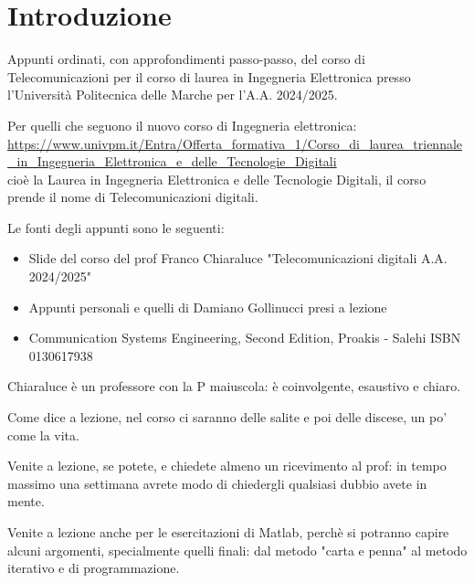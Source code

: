 \section*{Introduzione}

 

Appunti ordinati, con approfondimenti passo-passo, del corso di Telecomunicazioni per il corso di laurea in Ingegneria Elettronica 
presso l’Università Politecnica delle Marche per l'A.A. 2024/2025. \newline
        
Per quelli che seguono il nuovo corso di Ingegneria elettronica: \\
\url{https://www.univpm.it/Entra/Offerta_formativa_1/Corso_di_laurea_triennale_in_Ingegneria_Elettronica_e_delle_Tecnologie_Digitali} \\
cioè la Laurea in Ingegneria Elettronica e delle Tecnologie Digitali, 
il corso prende il nome di Telecomunicazioni digitali. \newline 


Le fonti degli appunti sono le seguenti: 

\begin{itemize}
    
    \item Slide del corso del prof Franco Chiaraluce 
    "Telecomunicazioni digitali A.A. 2024/2025" 
    
    \item Appunti personali e quelli di Damiano Gollinucci presi a lezione
    
    \item Communication Systems Engineering, Second Edition, Proakis - Salehi ISBN 0130617938

\end{itemize}

Chiaraluce è un professore con la P maiuscola: è coinvolgente, esaustivo e chiaro. \newline 

Come dice a lezione, nel corso ci saranno delle salite e poi delle discese, un po' come la vita. \newline 

Venite a lezione, se potete, e chiedete almeno un ricevimento al prof: in tempo massimo una settimana avrete modo di chiedergli qualsiasi dubbio avete in mente. \newline 

Venite a lezione anche per le esercitazioni di Matlab, perchè si potranno capire alcuni argomenti, specialmente quelli finali: dal metodo "carta e penna" al metodo iterativo e di programmazione. \newline 

